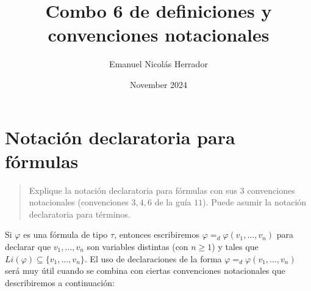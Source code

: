 \documentclass{article}
\title{Combo 6 de definiciones y convenciones notacionales}
\author{Emanuel Nicolás Herrador}
\date{November 2024}
\begin{document}
\maketitle

\section{Notación declaratoria para fórmulas}
\begin{quote}
  Explique la notación declaratoria para fórmulas con sus $3$ convenciones notacionales (convenciones $3,4,6$ de la guía $11$). Puede asumir la notación declaratoria para términos.
\end{quote}
Si $\varphi$ es una fórmula de tipo $\tau$, entonces escribiremos $\varphi=_d\varphi(v_1,\dots,v_n)$ para declarar que $v_1,\dots,v_n$ son variables distintas (con $n\geq 1$) y tales que $Li(\varphi)\subseteq\{v_1,\dots,v_n\}$.
\newline
El uso de declaraciones de la forma $\varphi=_d\varphi(v_1,\dots,v_n)$ será muy útil cuando se combina con ciertas convenciones notacionales que describiremos a continuación:
\end{document}
